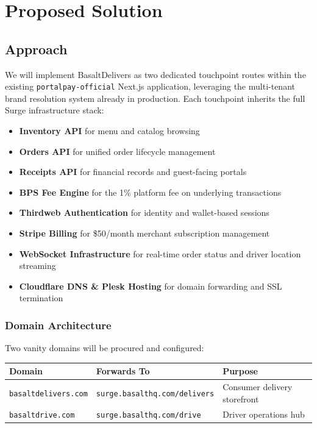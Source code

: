 \documentclass[11pt, letterpaper]{article}
\begin{document}
\section{Proposed Solution}

\subsection{Approach}
We will implement BasaltDelivers as two dedicated touchpoint routes within the existing \texttt{portalpay-official} Next.js application, leveraging the multi-tenant brand resolution system already in production. Each touchpoint inherits the full Surge infrastructure stack:

\begin{itemize}
    \item \textbf{Inventory API} for menu and catalog browsing
    \item \textbf{Orders API} for unified order lifecycle management
    \item \textbf{Receipts API} for financial records and guest-facing portals
    \item \textbf{BPS Fee Engine} for the 1\% platform fee on underlying transactions
    \item \textbf{Thirdweb Authentication} for identity and wallet-based sessions
    \item \textbf{Stripe Billing} for \$50/month merchant subscription management
    \item \textbf{WebSocket Infrastructure} for real-time order status and driver location streaming
    \item \textbf{Cloudflare DNS \& Plesk Hosting} for domain forwarding and SSL termination
\end{itemize}

\subsubsection{Domain Architecture}
Two vanity domains will be procured and configured:

\begin{center}
\begin{tabularx}{\textwidth}{@{}l l X@{}}
\toprule
\textbf{Domain} & \textbf{Forwards To} & \textbf{Purpose} \\
\midrule
\texttt{basaltdelivers.com} & \texttt{surge.basalthq.com/delivers} & Consumer delivery storefront \\
\texttt{basaltdrive.com} & \texttt{surge.basalthq.com/drive} & Driver operations hub \\
\bottomrule
\end{tabularx}
\end{center}
\end{document}

